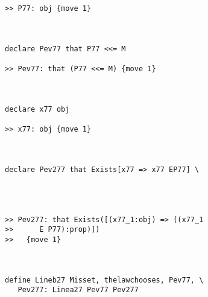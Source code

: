 \documentclass[12pt]{article}
\begin{document}
\begin{verbatim}
>> P77: obj {move 1}



declare Pev77 that P77 <<= M

>> Pev77: that (P77 <<= M) {move 1}



declare x77 obj

>> x77: obj {move 1}



declare Pev277 that Exists[x77 => x77 EP77] \
   



>> Pev277: that Exists([(x77_1:obj) => ((x77_1
>>      E P77):prop)])
>>   {move 1}



define Lineb27 Misset, thelawchooses, Pev77, \
   Pev277: Linea27 Pev77 Pev277


\end{verbatim}
\end{document}
